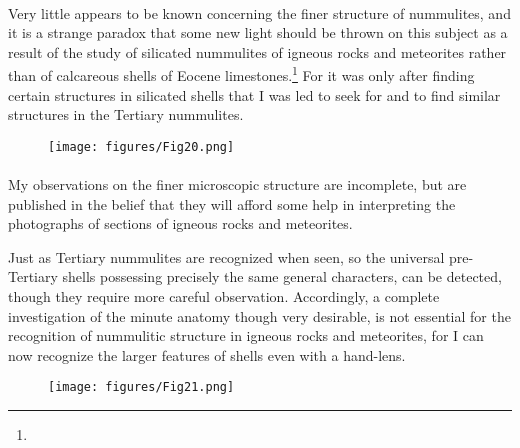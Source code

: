 \documentclass[a4paper, 12pt, oneside]{article}
\begin{document}
\paragraph{}
Very little appears to be known concerning the finer structure of nummulites, and it is a strange paradox that some new light should be thrown on this subject as a result of the study of silicated nummulites of igneous rocks and meteorites rather than of calcareous shells of Eocene limestones.\footnote{} For it was only after finding certain structures in silicated shells that I was led to seek for and to find similar structures in the Tertiary nummulites.
\begin{figure}[H]
\centering
\texttt{[image: figures/Fig20.png]}
\caption*{}
\end{figure}
\paragraph{}
My observations on the finer microscopic structure are incomplete, but are published in the belief that they will afford some help in interpreting the photographs of sections of igneous rocks and meteorites.

Just as Tertiary nummulites are recognized when seen, so the universal pre-Tertiary shells possessing precisely the same general characters, can be detected, though they require more careful observation. Accordingly, a complete investigation of the minute anatomy though very desirable, is not essential for the recognition of nummulitic structure in igneous rocks and meteorites, for I can now recognize the larger features of shells even with a hand-lens.
\begin{figure}[H]
\centering
\texttt{[image: figures/Fig21.png]}
\caption*{}
\end{figure}
\end{document}
